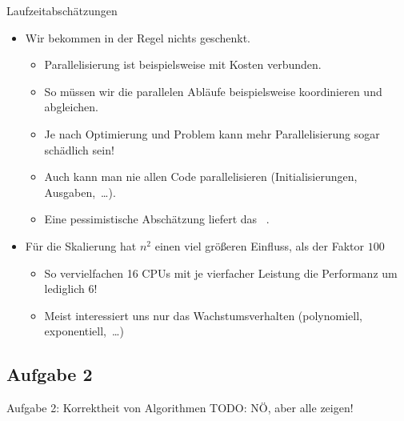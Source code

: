 {\iffull
{\AddonFrame
\begin{frame}{Laufzeitabschätzungen}
    \begin{itemize}[<+(1)->]
        \itemsep16pt
        \item Wir bekommen in der Regel  nichts geschenkt.
        \begin{itemize}
            \itemsep3.5pt
            \item Parallelisierung ist beispielsweise mit Kosten verbunden.
            \item So müssen wir die parallelen Abläufe beispielsweise koordinieren und abgleichen.
            \item Je nach Optimierung und Problem kann mehr Parallelisierung sogar schädlich sein!
            \item Auch kann man nie allen Code parallelisieren (Initialisierungen, Ausgaben,~\ldots).
            \item Eine pessimistische Abschätzung liefert das ~.
        \end{itemize}
        \item Für die Skalierung hat \(n^2\) einen viel größeren Einfluss, als der Faktor \(100\) \begin{itemize}
            \itemsep3.5pt
            \item So vervielfachen 16 CPUs mit je vierfacher Leistung die Performanz um lediglich \(6\)!
            \item Meist interessiert uns nur das Wachstumsverhalten (polynomiell, exponentiell,~\ldots)
        \end{itemize}
    \end{itemize}
\end{frame}}
\fi
}

\subsection{Aufgabe 2}
\begin{frame}{Aufgabe 2: Korrektheit von Algorithmen}
TODO: NÖ, aber alle zeigen!
\end{frame}

